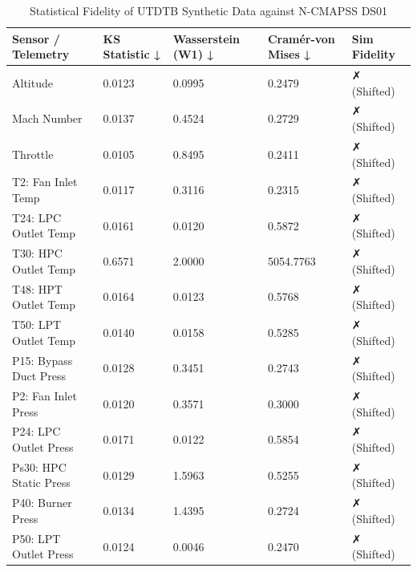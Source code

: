 \begin{table}
\caption{Statistical Fidelity of UTDTB Synthetic Data against N-CMAPSS DS01}
\label{tab:dataset_stats}
\begin{tabular}{lllll}
\toprule
Sensor / Telemetry & KS Statistic ↓ & Wasserstein (W1) ↓ & Cramér-von Mises ↓ & Sim Fidelity \\
\midrule
Altitude & 0.0123 & 0.0995 & 0.2479 & ✗ (Shifted) \\
Mach Number & 0.0137 & 0.4524 & 0.2729 & ✗ (Shifted) \\
Throttle & 0.0105 & 0.8495 & 0.2411 & ✗ (Shifted) \\
T2: Fan Inlet Temp & 0.0117 & 0.3116 & 0.2315 & ✗ (Shifted) \\
T24: LPC Outlet Temp & 0.0161 & 0.0120 & 0.5872 & ✗ (Shifted) \\
T30: HPC Outlet Temp & 0.6571 & 2.0000 & 5054.7763 & ✗ (Shifted) \\
T48: HPT Outlet Temp & 0.0164 & 0.0123 & 0.5768 & ✗ (Shifted) \\
T50: LPT Outlet Temp & 0.0140 & 0.0158 & 0.5285 & ✗ (Shifted) \\
P15: Bypass Duct Press & 0.0128 & 0.3451 & 0.2743 & ✗ (Shifted) \\
P2: Fan Inlet Press & 0.0120 & 0.3571 & 0.3000 & ✗ (Shifted) \\
P24: LPC Outlet Press & 0.0171 & 0.0122 & 0.5854 & ✗ (Shifted) \\
Ps30: HPC Static Press & 0.0129 & 1.5963 & 0.5255 & ✗ (Shifted) \\
P40: Burner Press & 0.0134 & 1.4395 & 0.2724 & ✗ (Shifted) \\
P50: LPT Outlet Press & 0.0124 & 0.0046 & 0.2470 & ✗ (Shifted) \\
\bottomrule
\end{tabular}
\end{table}
